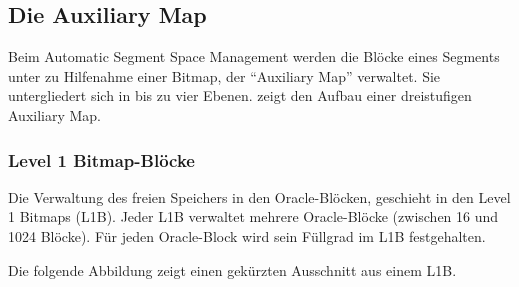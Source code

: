       \subsection{Die Auxiliary Map}
        Beim Automatic Segment Space Management werden die Blöcke eines Segments unter zu Hilfenahme einer Bitmap, der \enquote{Auxiliary Map} verwaltet. Sie untergliedert sich in bis zu vier Ebenen.  zeigt den Aufbau einer dreistufigen Auxiliary Map.
        \subsubsection{Level 1 Bitmap-Blöcke}
          Die Verwaltung des freien Speichers in den Oracle-Blöcken, geschieht in den Level 1 Bitmaps (L1B). Jeder L1B verwaltet mehrere Oracle-Blöcke (zwischen 16 und 1024 Blöcke). Für jeden Oracle-Block wird sein Füllgrad im L1B festgehalten.

          Die folgende Abbildung zeigt einen gekürzten Ausschnitt aus einem L1B.
\clearpage

